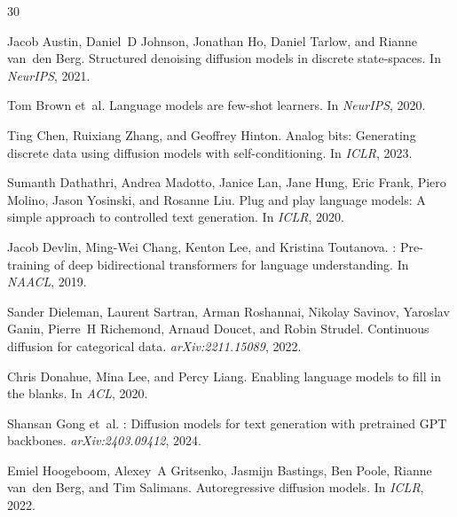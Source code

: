 \documentclass{article}
\begin{document}

% 

\begin{thebibliography}{30}

Jacob Austin, Daniel~D Johnson, Jonathan Ho, Daniel Tarlow, and Rianne van~den Berg.
\newblock Structured denoising diffusion models in discrete state-spaces.
\newblock In \emph{NeurIPS}, 2021.

Tom Brown et~al.
\newblock Language models are few-shot learners.
\newblock In \emph{NeurIPS}, 2020.

Ting Chen, Ruixiang Zhang, and Geoffrey Hinton.
\newblock Analog bits: Generating discrete data using diffusion models with self-conditioning.
\newblock In \emph{ICLR}, 2023.

Sumanth Dathathri, Andrea Madotto, Janice Lan, Jane Hung, Eric Frank, Piero Molino, Jason Yosinski, and Rosanne Liu.
\newblock Plug and play language models: A simple approach to controlled text generation.
\newblock In \emph{ICLR}, 2020.

Jacob Devlin, Ming-Wei Chang, Kenton Lee, and Kristina Toutanova.
: Pre-training of deep bidirectional transformers for language understanding.
\newblock In \emph{NAACL}, 2019.

Sander Dieleman, Laurent Sartran, Arman Roshannai, Nikolay Savinov, Yaroslav Ganin, Pierre~H Richemond, Arnaud Doucet, and Robin Strudel.
\newblock Continuous diffusion for categorical data.
\newblock \emph{arXiv:2211.15089}, 2022.

Chris Donahue, Mina Lee, and Percy Liang.
\newblock Enabling language models to fill in the blanks.
\newblock In \emph{ACL}, 2020.

Shansan Gong et~al.
: Diffusion models for text generation with pretrained {GPT} backbones.
\newblock \emph{arXiv:2403.09412}, 2024.

Emiel Hoogeboom, Alexey~A Gritsenko, Jasmijn Bastings, Ben Poole, Rianne van~den Berg, and Tim Salimans.
\newblock Autoregressive diffusion models.
\newblock In \emph{ICLR}, 2022.


\end{thebibliography}
\end{document}
